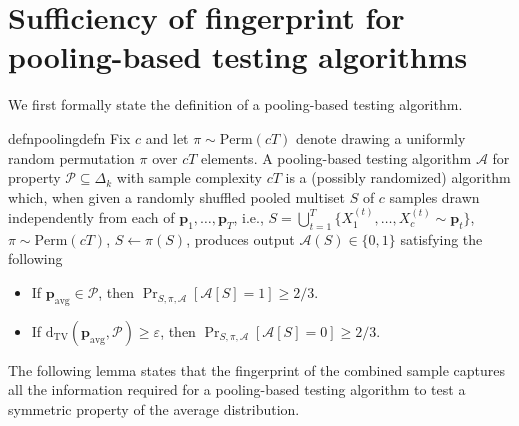 \documentclass[10pt]{article} %
\def\eps{{\varepsilon}}
\theoremstyle{plain}
\newcommand{\bp}{\textbf{p}}
\newcommand{\dtv}{\mathrm{d_{TV}}}
\newcommand{\avg}{\mathrm{avg}}
\newcommand{\prop}{\mathcal{P}}
\newcommand{\dom}[1]{\Delta_{#1}}
\begin{document}
\section{Sufficiency of fingerprint for pooling-based testing algorithms}
\label{sec:fingerprint_sufficiency}

We first formally state the definition of a pooling-based testing algorithm.
\begin{restatable}{defn}{poolingdefn}
	\label{def:poolingdefn}
	Fix $c$ and let $\pi \sim \textrm{Perm}(cT)$ denote drawing a uniformly random permutation $\pi$ over $cT$ elements. A pooling-based testing algorithm $\mathcal{A}$ for property $\prop \subseteq \dom{k}$ with sample complexity $cT$ is a (possibly randomized) algorithm which, when given a randomly shuffled pooled multiset $S$ of $c$ samples drawn independently from each of $\bp_1,\dots,\bp_T$, i.e., $S = \bigcup_{t=1}^T\{X^{(t)}_1,\dots, X^{(t)}_c \sim \bp_t\}$, $\pi \sim \textrm{Perm}(cT)$, $S \gets \pi(S)$, produces output $\mathcal{A}(S) \in \{0,1\}$ satisfying the following
	\begin{itemize}
		\item If $\bp_{\avg} \in \prop$, then $\Pr_{S, \pi, \mathcal{A}}[\mathcal{A}[S]=1] \ge 2/3$.
		\item If $\dtv(\bp_{\avg}, \prop) \ge \eps$, then $\Pr_{S, \pi, \mathcal{A}}[\mathcal{A}[S]=0] \ge 2/3$.
	\end{itemize}
\end{restatable}

The following lemma states that the fingerprint of the combined sample captures all the information required for a pooling-based testing algorithm to test a symmetric property of the average distribution.
\end{document}
